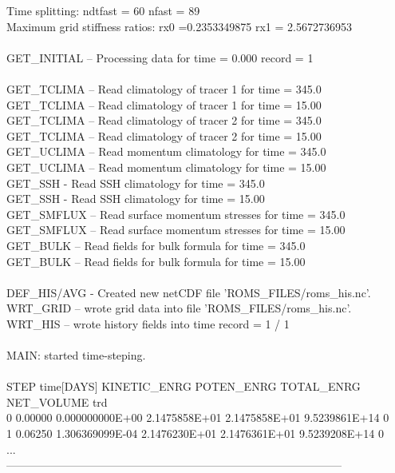  Time splitting: ndtfast = 60    nfast = 89\\
 Maximum grid stiffness ratios:   rx0 =0.2353349875  rx1 =  2.5672736953\\
\\
      GET\_INITIAL -- Processing data for time =   0.000     record =   1\\
\\
      GET\_TCLIMA -- Read climatology of tracer   1 for time =    345.0 \\   
      GET\_TCLIMA -- Read climatology of tracer   1 for time =    15.00 \\   
      GET\_TCLIMA -- Read climatology of tracer   2 for time =    345.0 \\   
      GET\_TCLIMA -- Read climatology of tracer   2 for time =    15.00 \\   
      GET\_UCLIMA -- Read momentum climatology      for time =    345.0 \\   
      GET\_UCLIMA -- Read momentum climatology      for time =    15.00 \\   
      GET\_SSH     - Read SSH climatology           for time =    345.0 \\   
      GET\_SSH     - Read SSH climatology           for time =    15.00 \\   
      GET\_SMFLUX -- Read surface momentum stresses for time =    345.0 \\   
      GET\_SMFLUX -- Read surface momentum stresses for time =    15.00 \\   
      GET\_BULK   -- Read fields for bulk formula   for time =    345.0 \\   
      GET\_BULK   -- Read fields for bulk formula   for time =    15.00 \\   
\\
      DEF\_HIS/AVG - Created new netCDF file 'ROMS\_FILES/roms\_his.nc'.\\
      WRT\_GRID -- wrote grid data into file 'ROMS\_FILES/roms\_his.nc'.\\
      WRT\_HIS -- wrote history fields into time record =   1 /   1\\
\\
 MAIN: started time-steping.\\
\\
 STEP   time[DAYS] KINETIC\_ENRG    POTEN\_ENRG    TOTAL\_ENRG    NET\_VOLUME   trd\\
     0     0.00000 0.000000000E+00 2.1475858E+01 2.1475858E+01 9.5239861E+14  0\\
     1     0.06250 1.306369099E-04 2.1476230E+01 2.1476361E+01 9.5239208E+14  0\\
...\\
------------------------------------------------------------------------------------------\\

